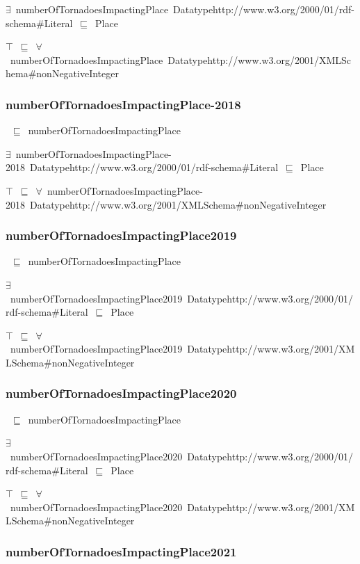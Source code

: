 \documentclass{article}
\begin{document}
\ensuremath{\exists}~numberOfTornadoesImpactingPlace~Datatypehttp://www.w3.org/2000/01/rdf-schema#Literal~\ensuremath{\sqsubseteq}~Place

\ensuremath{\top}~\ensuremath{\sqsubseteq}~\ensuremath{\forall}~numberOfTornadoesImpactingPlace~Datatypehttp://www.w3.org/2001/XMLSchema#nonNegativeInteger

\subsubsection*{numberOfTornadoesImpactingPlace-2018}

~\ensuremath{\sqsubseteq}~numberOfTornadoesImpactingPlace

\ensuremath{\exists}~numberOfTornadoesImpactingPlace-2018~Datatypehttp://www.w3.org/2000/01/rdf-schema#Literal~\ensuremath{\sqsubseteq}~Place

\ensuremath{\top}~\ensuremath{\sqsubseteq}~\ensuremath{\forall}~numberOfTornadoesImpactingPlace-2018~Datatypehttp://www.w3.org/2001/XMLSchema#nonNegativeInteger

\subsubsection*{numberOfTornadoesImpactingPlace2019}

~\ensuremath{\sqsubseteq}~numberOfTornadoesImpactingPlace

\ensuremath{\exists}~numberOfTornadoesImpactingPlace2019~Datatypehttp://www.w3.org/2000/01/rdf-schema#Literal~\ensuremath{\sqsubseteq}~Place

\ensuremath{\top}~\ensuremath{\sqsubseteq}~\ensuremath{\forall}~numberOfTornadoesImpactingPlace2019~Datatypehttp://www.w3.org/2001/XMLSchema#nonNegativeInteger

\subsubsection*{numberOfTornadoesImpactingPlace2020}

~\ensuremath{\sqsubseteq}~numberOfTornadoesImpactingPlace

\ensuremath{\exists}~numberOfTornadoesImpactingPlace2020~Datatypehttp://www.w3.org/2000/01/rdf-schema#Literal~\ensuremath{\sqsubseteq}~Place

\ensuremath{\top}~\ensuremath{\sqsubseteq}~\ensuremath{\forall}~numberOfTornadoesImpactingPlace2020~Datatypehttp://www.w3.org/2001/XMLSchema#nonNegativeInteger

\subsubsection*{numberOfTornadoesImpactingPlace2021}
\end{document}
